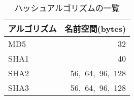 \begin{table}[htbp]
 \caption{ハッシュアルゴリズムの一覧}
 \centering
  \begin{tabular}{lr}
    \toprule
		\multicolumn{1}{c}{\textbf{アルゴリズム}} & \multicolumn{1}{c}{\textbf{名前空間(bytes)}} \\
    \midrule
		MD5 & 32\\
		SHA1 & 40 \\
		SHA2 & 56,\ 64,\ 96,\ 128\\
		SHA3 & 56,\ 64,\ 96,\ 128\\
    \bottomrule
  \end{tabular}
 \label{tab:hash-functions}
\end{table}
